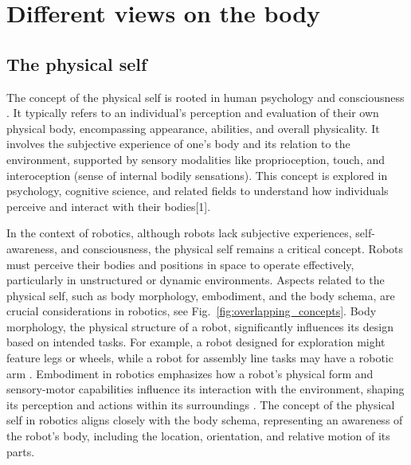 \section{Different views on the body}

\subsection{The physical self}
The concept of the physical self is rooted in human psychology and consciousness \cite{Tsakiris2016multisensorybasisself,Overgaard2023selfitsbody}. It typically refers to an individual's perception and evaluation of their own physical body, encompassing appearance, abilities, and overall physicality. It involves the subjective experience of one's body and its relation to the environment, supported by sensory modalities like proprioception, touch, and interoception (sense of internal bodily sensations). This concept is explored in psychology, cognitive science, and related fields to understand how individuals perceive and interact with their bodies[1].

In the context of robotics, although robots lack subjective experiences, self-awareness, and consciousness, the physical self remains a critical concept. Robots must perceive their bodies and positions in space to operate effectively, particularly in unstructured or dynamic environments. Aspects related to the physical self, such as body morphology, embodiment, and the body schema, are crucial considerations in robotics, see Fig.~\ref{fig:overlapping_concepts}. Body morphology, the physical structure of a robot, significantly influences its design based on intended tasks. For example, a robot designed for exploration might feature legs or wheels, while a robot for assembly line tasks may have a robotic arm \cite{Miller2018EmbodimentSituatednessMorphology}. Embodiment in robotics emphasizes how a robot's physical form and sensory-motor capabilities influence its interaction with the environment, shaping its perception and actions within its surroundings \cite{Wainer2006rolephysicalembodiment}. The concept of the physical self in robotics aligns closely with the body schema, representing an awareness of the robot's body, including the location, orientation, and relative motion of its parts.

